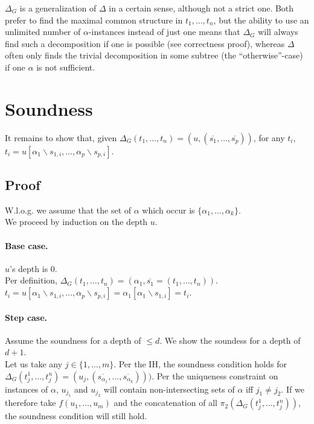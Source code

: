 \documentclass[a4paper, 11pt]{report}
\begin{document}
$\Delta_G$ is a generalization of $\Delta$ in a certain sense, although not a strict one. Both prefer to find the maximal common structure in $t_1,\dots,t_n$, but the ability to use an unlimited number of $\alpha$-instances instead of just one means that $\Delta_G$ will always find such a decomposition if one is possible (see correctness proof), whereas $\Delta$ often only finds the trivial decomposition in some subtree (the ``otherwise''-case) if one $\alpha$ is not sufficient.

\section{Soundness}

It remains to show that, given $\Delta_G(t_1,\dots,t_n) = (u,(\overline{s_1},\dots,\overline{s_p}))$, for any $t_i$, $t_i = u[\alpha_1\backslash s_{1,i},\dots,\alpha_p\backslash s_{p,i}]$.

\subsection{Proof}

W.l.o.g. we assume that the set of $\alpha$ which occur is $\{\alpha_1,\dots,\alpha_k\}$.\\
We proceed by induction on the depth $u$.

\paragraph{Base case.} $u$'s depth is 0.\\
Per definition, $\Delta_G(t_1,\dots,t_n) = (\alpha_1,\overline{s_1} = (t_1,\dots,t_n))$.\\
$t_i = u[\alpha_1\backslash s_{1,i},\dots,\alpha_p\backslash s_{p,i}] = \alpha_1[\alpha_1\backslash s_{1,i}] = t_i$.

\paragraph{Step case.} Assume the soundness for a depth of $\leq d$. We show the soundess for a depth of $d+1$.\\

Let us take any $j \in \{1,\dots,m\}$. Per the IH, the soundness condition holds for $\Delta_G(t_j^1,\dots,t_j^n) = (u_j, (\overline{s_{\alpha_1}},\dots,\overline{s_{\alpha_k}})))$. Per the uniqueness constraint on instances of $\alpha$, $u_{j_1}$ and $u_{j_2}$ will contain non-intersecting sets of $\alpha$ iff $j_1 \neq j_2$. If we therefore take $f(u_1,\dots,u_m)$ and the concatenation of all $\pi_2(\Delta_G(t_j^1,\dots,t_j^n))$, the soundness condition will still hold.\\
\end{document}
